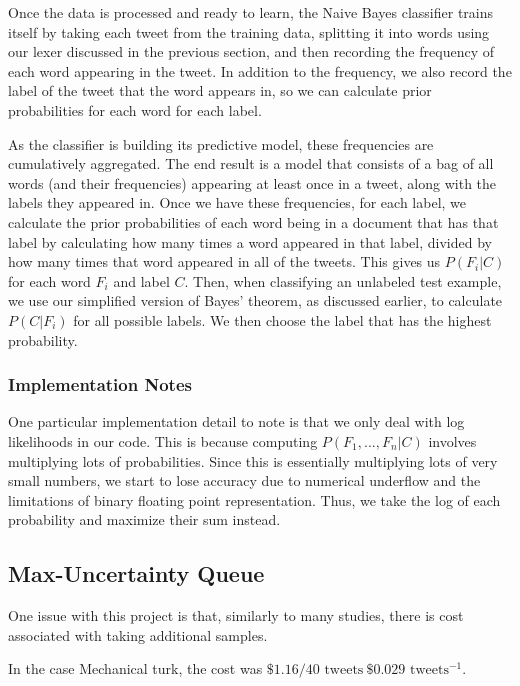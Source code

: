 \documentclass[12pt,a4paper]{article}
\begin{document}
Once the data is processed and ready to learn, the Naive Bayes classifier trains itself by taking each tweet from the training data, splitting it into words using our lexer discussed in the previous section, and then recording the frequency of each word appearing in the tweet. In addition to the frequency, we also record the label of the tweet that the word appears in, so we can calculate prior probabilities for each word for each label.

As the classifier is building its predictive model, these frequencies are cumulatively aggregated. The end result is a model that consists of a bag of all words (and their frequencies) appearing at least once in a tweet, along with the labels they appeared in. Once we have these frequencies, for each label, we calculate the prior probabilities of each word being in a document that has that label by calculating how many times a word appeared in that label, divided by how many times that word appeared in all of the tweets. This gives us $P(F_i | C)$ for each word $F_i$ and label $C$. Then, when classifying an unlabeled test example, we use our simplified version of Bayes' theorem, as discussed earlier, to calculate $P(C | F_i)$ for all possible labels. We then choose the label that has the highest probability.

\subsubsection { Implementation Notes }

One particular implementation detail to note is that we only deal with log likelihoods in our code. This is because computing $P(F_1, ..., F_n | C)$ involves multiplying lots of probabilities. Since this is essentially multiplying lots of very small numbers, we start to lose accuracy due to numerical underflow and the limitations of binary floating point representation. Thus, we take the log of each probability and maximize their sum instead.

\subsection { Max-Uncertainty Queue }

One issue with this project is that, similarly to many studies, there is cost associated with taking additional samples.

In the case Mechanical turk, the cost was $ \$1.16 / 40 \text{ tweets} ~ \$0.029 \text{ tweets}^{-1}$. 
\end{document}
